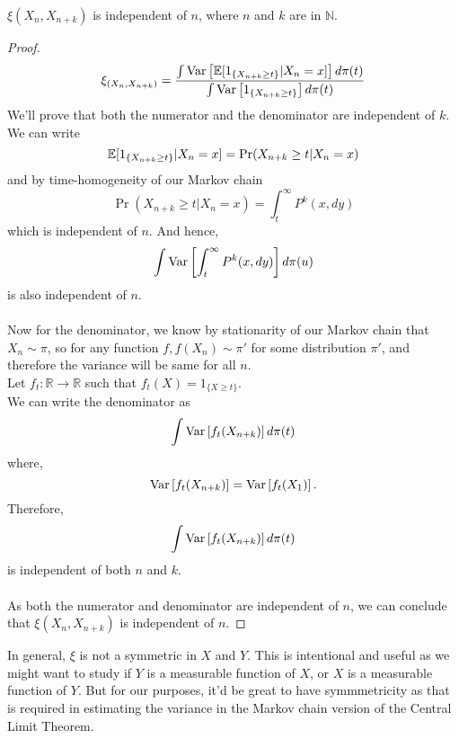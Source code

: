 \begin{theorem}
    $\xi(X_n, X_{n+k})$ is independent of $n$, where $n$ and $k$ are in $\mathbb{N}$.
    \begin{proof}
        \begin{equation}
            \xi_{(X_n, X_{n+k})} = \frac{\int \text{Var}\left[{{\mathbb{E}[1_{\{X_{n+k} \geq t\}}|X_n=x]}}\right] d\pi(t)}{\int \text{Var}\left[{{1_{\{X_{n+k} \geq t\}}}}\right] d\pi(t)}
        \end{equation}
        We'll prove that both the numerator and the denominator are independent of $k$. \\
        We can write
        \begin{equation*}
            \mathbb{E}[1_{\{X_{n+k} \geq t\}}|X_n=x] = \Pr(X_{n+k} \geq t|X_n=x) \\
        \end{equation*}
        and by time-homogeneity of our Markov chain
        \begin{equation*}
            \Pr(X_{n+k} \geq t|X_n=x) = \int_t^{\infty} P^k(x, dy)
        \end{equation*}
        which is independent of $n$. And hence,
        \begin{equation}
            \int \text{Var}\left[{{\int_t^{\infty} P^k(x, dy)}}\right] d\pi(u)
        \end{equation}
        is also independent of $n$.\\\\
        Now for the denominator, we know by stationarity of our Markov chain that $X_n \sim \pi$, so for any function $f, f(X_n) \sim \pi'$ for some distribution $\pi'$, and therefore the variance will be same for all $n$.\\
        Let $f_t: \mathbb{R} \rightarrow \mathbb{R}$ such that $f_t(X) = 1_{\{X \geq t\}}$.\\
        We can write the denominator as
        $$\int \text{Var}\left[{{f_t(X_{n+k})}}\right] d\pi(t)$$
        where,
        $$\text{Var}\left[{{f_t(X_{n+k})}}\right] = \text{Var}\left[{{f_t(X_{1})}}\right].$$
        Therefore,
        $$\int \text{Var}\left[{{f_t(X_{n+k})}}\right] d\pi(t)$$
        is independent of both $n$ and $k$.\\\\
        As both the numerator and denominator are independent of $n$, we can conclude that $\xi(X_n, X_{n+k})$ is independent of $n$.
    \end{proof}
\end{theorem}
\newpage
In general, $\xi$ is not a symmetric in $X$ and $Y$. This is intentional and useful as we might want to study if $Y$ is a measurable function of $X$, or $X$ is a measurable function of $Y$.
But for our purposes, it'd be great to have symmmetricity as that is required in estimating the variance in the Markov chain version of the Central Limit Theorem.

